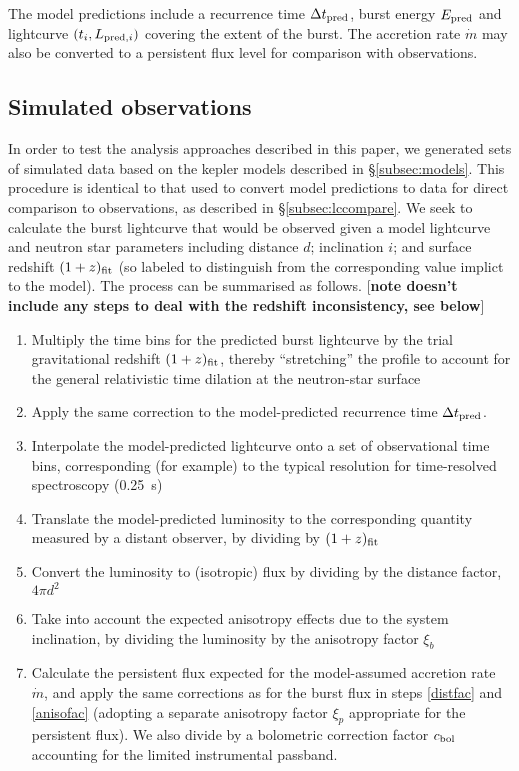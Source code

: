 \documentclass{aastex61}
\begin{document}
The model predictions include a recurrence time $\Delta t_{\rm pred}$, burst energy $E_{\rm pred}$ and lightcurve $(t_i,L_{{\rm pred},i})$ covering the extent of the burst.
%
The accretion rate $\dot{m}$ may also be converted to a persistent flux level for comparison with observations.

\subsection{Simulated observations}
\label{subsec:simobs}

In order to test the analysis approaches described in this paper, we generated sets of simulated data based on the {\sc kepler} models described in \S\ref{subsec:models}. 
%
This procedure is identical to that used to convert model predictions to data for direct comparison to observations, as described in \S\ref{subsec:lccompare}.
%
We seek to calculate the burst lightcurve that would be observed given a model lightcurve and neutron star parameters including distance $d$; inclination $i$; and surface redshift $(1+z)_{\rm fit}$ (so labeled to distinguish from the corresponding value implict to the model). The process can be summarised as follows. [{\bf note doesn't include any steps to deal with the redshift inconsistency, see below}]
\begin{enumerate}
\item Multiply the time bins for the predicted burst lightcurve by the trial gravitational redshift $(1+z)_{\rm fit}$, thereby ``stretching'' the profile to account for the general relativistic time dilation at the neutron-star surface
\item Apply the same correction to the model-predicted recurrence time $\Delta t_{\rm pred}$.
\item Interpolate the model-predicted lightcurve onto a set of observational time bins, corresponding (for example) to the typical resolution for time-resolved spectroscopy (0.25~s)
\item Translate the model-predicted luminosity to the corresponding quantity measured by a distant observer, by 
dividing by $(1+z)_{\rm fit}$
\item Convert the luminosity to (isotropic) flux by dividing by the distance factor, $4\pi d^2$ \label{distfac}
\item Take into account the expected anisotropy effects due to the system inclination, by dividing the luminosity by the anisotropy factor $\xi_b$ \label{anisofac}
\item Calculate the persistent flux expected for the model-assumed accretion rate $\dot{m}$, and apply the same corrections as for the burst flux in steps \ref{distfac} and \ref{anisofac} (adopting a separate anisotropy factor $\xi_p$ appropriate for the persistent flux). We also divide by a bolometric correction factor $c_{\rm bol}$ accounting for the limited instrumental passband.
\end{enumerate}
\end{document}
